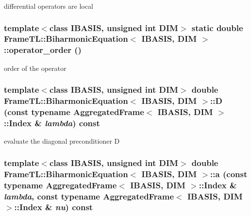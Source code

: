 differential operators are local \hypertarget{classFrameTL_1_1BiharmonicEquation_89f12c9466f7e91a5dc94c45525ee17f}{
\subsubsection[operator\_\-order]{\setlength{\rightskip}{0pt plus 5cm}template$<$class IBASIS, unsigned int DIM$>$ static double {\bf FrameTL::BiharmonicEquation}$<$ IBASIS, DIM $>$::operator\_\-order ()}}
\label{classFrameTL_1_1BiharmonicEquation_89f12c9466f7e91a5dc94c45525ee17f}


order of the operator \hypertarget{classFrameTL_1_1BiharmonicEquation_d16c3e0cfbdc25d321fece0ce1e7069e}{
\subsubsection[D]{\setlength{\rightskip}{0pt plus 5cm}template$<$class IBASIS, unsigned int DIM$>$ double {\bf FrameTL::BiharmonicEquation}$<$ IBASIS, DIM $>$::D (const typename {\bf AggregatedFrame}$<$ IBASIS, DIM $>$::{\bf Index} \& {\em lambda}) const}}
\label{classFrameTL_1_1BiharmonicEquation_d16c3e0cfbdc25d321fece0ce1e7069e}


evaluate the diagonal preconditioner D \hypertarget{classFrameTL_1_1BiharmonicEquation_7e489f4287862dad10b3334316bf786a}{
\subsubsection[a]{\setlength{\rightskip}{0pt plus 5cm}template$<$class IBASIS, unsigned int DIM$>$ double {\bf FrameTL::BiharmonicEquation}$<$ IBASIS, DIM $>$::a (const typename {\bf AggregatedFrame}$<$ IBASIS, DIM $>$::{\bf Index} \& {\em lambda}, \/  const typename {\bf AggregatedFrame}$<$ IBASIS, DIM $>$::{\bf Index} \& {\em nu}) const}}
\label{classFrameTL_1_1BiharmonicEquation_7e489f4287862dad10b3334316bf786a}


